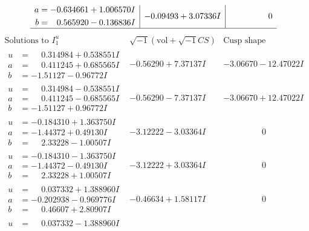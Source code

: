 \documentclass[1p]{elsarticle_modified}
\theoremstyle{definition}
\newcommand{\I}{\sqrt{-1}}
\begin{document}
$$\begin{array}{c|c|c}
\begin{aligned}
a &= -0.634661 + 1.006570 I \\
b &= \phantom{-}0.565920 - 0.136836 I\end{aligned}
 & -0.09493 + 3.07336 I & \phantom{-0.000000 } 0\\
 \hline 
 \end{array}$$\newpage$$\begin{array}{c|c|c}  
\text{Solutions to }I^u_{1}& \I (\text{vol} + \sqrt{-1}CS) & \text{Cusp shape}\\
 \hline 
\begin{aligned}
u &= \phantom{-}0.314984 + 0.538551 I \\
a &= \phantom{-}0.411245 + 0.685565 I \\
b &= -1.51127 - 0.96772 I\end{aligned}
 & -0.56290 + 7.37137 I & -3.06670 - 12.47022 I \\ \hline\begin{aligned}
u &= \phantom{-}0.314984 - 0.538551 I \\
a &= \phantom{-}0.411245 - 0.685565 I \\
b &= -1.51127 + 0.96772 I\end{aligned}
 & -0.56290 - 7.37137 I & -3.06670 + 12.47022 I \\ \hline\begin{aligned}
u &= -0.184310 + 1.363750 I \\
a &= -1.44372 + 0.49130 I \\
b &= \phantom{-}2.33228 - 1.00507 I\end{aligned}
 & -3.12222 - 3.03364 I & \phantom{-0.000000 } 0 \\ \hline\begin{aligned}
u &= -0.184310 - 1.363750 I \\
a &= -1.44372 - 0.49130 I \\
b &= \phantom{-}2.33228 + 1.00507 I\end{aligned}
 & -3.12222 + 3.03364 I & \phantom{-0.000000 } 0 \\ \hline\begin{aligned}
u &= \phantom{-}0.037332 + 1.388960 I \\
a &= -0.202938 - 0.969776 I \\
b &= \phantom{-}0.46607 + 2.80907 I\end{aligned}
 & -0.46634 + 1.58117 I & \phantom{-0.000000 } 0 \\ \hline\begin{aligned}
u &= \phantom{-}0.037332 - 1.388960 I \\

\end{aligned}
\end{array}$$
\end{document}
